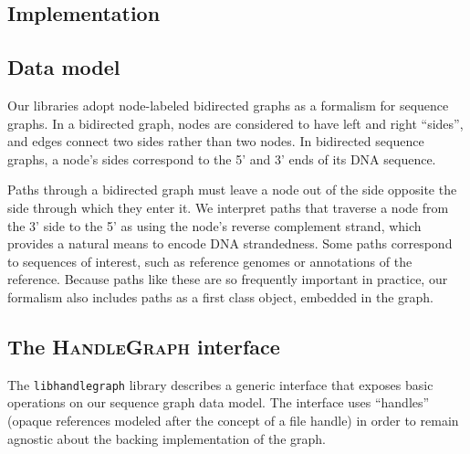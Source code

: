 \documentclass{bioinfo}
\begin{document}
\begin{methods}

\section{Implementation}

\subsection{Data model}

Our libraries adopt node-labeled bidirected graphs as a formalism for sequence graphs.
In a bidirected graph, nodes are considered to have left and right ``sides'', and edges connect two sides rather than two nodes.
In bidirected sequence graphs, a node's sides correspond to the 5' and 3' ends of its DNA sequence. 

Paths through a bidirected graph must leave a node out of the side opposite the side through which they enter it.
We interpret paths that traverse a node from the 3' side to the 5' as using the node's reverse complement strand, which provides a natural means to encode DNA strandedness.
Some paths correspond to sequences of interest, such as reference genomes or annotations of the reference.
Because paths like these are so frequently important in practice, our formalism also includes paths as a first class object, embedded in the graph.

\subsection{The \textsc{HandleGraph} interface}

The \texttt{libhandlegraph} library describes a generic interface that exposes basic operations on our sequence graph data model.
The interface uses ``handles'' (opaque references modeled after the concept of a file handle) in order to remain agnostic about the backing implementation of the graph.


\end{methods}
\end{document}
